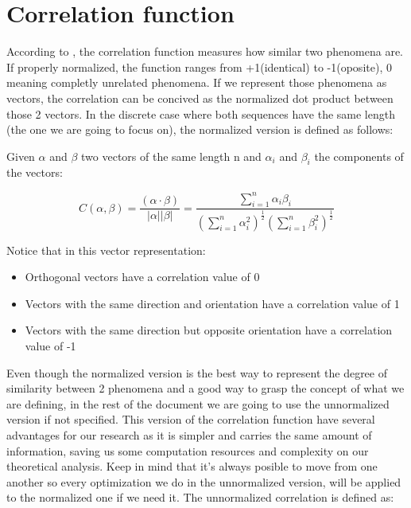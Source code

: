 
\section{Correlation function}

According to \citet{golomb_ref}, the correlation function measures how similar
two phenomena are. If properly normalized, the function ranges from
+1(identical) to -1(oposite), 0 meaning completly unrelated phenomena.
If we represent those phenomena as vectors, the correlation can be concived
as the normalized dot product between those 2 vectors.
In the discrete case where both sequences have the same length (the one we are
going to focus on), the normalized version is defined as follows:

\begin{definition}\label{def:1}

Given $\alpha$ and $\beta$ two vectors of the same length n and $\alpha_{i}$
and $\beta_{i}$ the components of the vectors:

\begin{equation}\label{eq:1}
C(\alpha , \beta)=\frac{(\alpha \cdot  \beta)}{|\alpha||\beta|}=\frac{\sum_{i=1}^{n} \alpha_{i}\beta_{i}}{(\sum_{i=1}^{n} \alpha_{i}^{2})^{\frac{1}{2}}(\sum_{i=1}^{n} \beta_{i}^{2})^\frac{1}{2}}
\end{equation}
\end{definition}

Notice that in this vector
representation:
\begin{itemize}
  \item Orthogonal vectors have a correlation value of 0
  \item Vectors with the same direction and orientation have a correlation
  value of 1
  \item Vectors with the same direction but opposite orientation have a
  correlation value of -1
\end{itemize}

Even though the normalized version is the best way to represent the degree
of similarity between 2 phenomena and a good way to grasp the concept of
what we are defining, in the rest of the document we are going to use the
unnormalized version if not specified. This version of the correlation function
have several advantages for our research as it is simpler and carries the same
amount of information, saving us some computation resources and complexity on
our theoretical analysis. Keep in mind that it's always posible to move from
one another so every optimization we do in the unnormalized version, will be
applied to the normalized one if we need it. The unnormalized correlation is
defined as:

